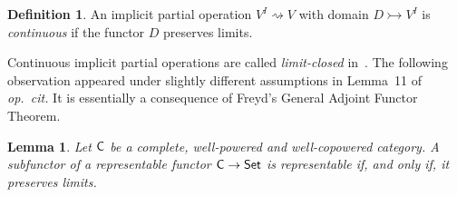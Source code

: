 \documentclass[a4paper,10pt,reqno]{amsart}
\newtheorem{lemma}[theorem]{Lemma}
\theoremstyle{definition}
\newtheorem{definition}[theorem]{Definition}
\theoremstyle{remark}
\newcommand{\cat}{{\sf C}}								%
\newcommand{\Set}{{\sf Set}}							%
\begin{document}
\begin{definition}
An implicit partial operation $V^{I} \rightsquigarrow V$ with domain $D\rightarrowtail V^{I}$ is \emph{continuous} if the functor $D$ preserves limits.
\end{definition}


Continuous implicit partial operations are called \emph{limit-closed} in~\cite{Hebert1998}. The following observation appeared under slightly different assumptions in Lemma~11 of \emph{op.~cit.} It is essentially a consequence of Freyd's General Adjoint Functor Theorem.


\begin{lemma}\label{l:subfunctor-of-representable}
Let $\cat$ be a complete, well-powered and well-copowered category. A subfunctor of a representable functor $\cat \to \Set$ is representable if, and only if, it preserves limits.
\end{lemma}
\end{document}
